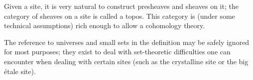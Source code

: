 \documentclass{article}
\begin{document}
Given a site, it is very natural to construct presheaves and sheaves on it; the category of sheaves on a site is called a topos.  This category is (under some technical assumptions) rich enough to allow a cohomology theory.

The reference to universes and small sets in the definition may be safely ignored for most purposes; they exist to deal with set-theoretic difficulties one can encounter when dealing with certain sites (such as the crystalline site or the big \'etale site).

\begin{thebibliography}{9}


\end{thebibliography}
\end{document}

